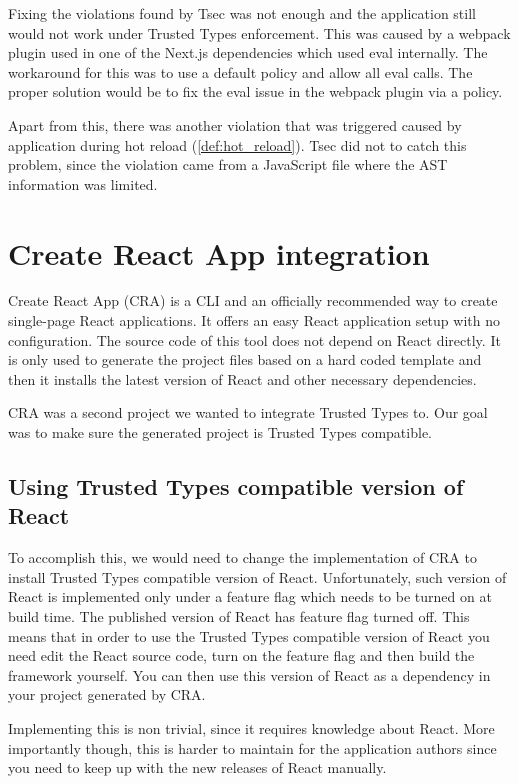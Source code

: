 Fixing the violations found by Tsec was not enough and the application still would not work under
Trusted Types enforcement. This was caused by a webpack plugin used in one of the Next.js
dependencies which used eval internally. The workaround for this was to use a default policy and
allow all eval calls. The proper solution would be to fix the eval issue in the webpack plugin via a
policy.

Apart from this, there was another violation that was triggered caused by application during hot
reload (\ref{def:hot_reload}). Tsec did not to catch this problem, since the violation came from a
JavaScript file where the AST information was limited.

\section{Create React App integration}

Create React App (CRA) is a CLI and an officially recommended way to create single-page React
applications. It offers an easy React application setup with no configuration. The source code of
this tool does not depend on React directly. It is only used to generate the project files based on
a hard coded template and then it installs the latest version of React and other necessary
dependencies.

CRA was a second project we wanted to integrate Trusted Types to. Our goal was to make sure the
generated project is Trusted Types compatible.

\subsection{Using Trusted Types compatible version of React}

To accomplish this, we would need to change the implementation of CRA to install Trusted Types
compatible version of React. Unfortunately, such version of React is implemented only under a
feature flag which needs to be turned on at build time. The published version of React has
feature flag turned off. This means that in order to use the Trusted Types compatible version of
React you need edit the React source code, turn on the feature flag and then build the framework
yourself. You can then use this version of React as a dependency in your project generated by CRA.

Implementing this is non trivial, since it requires knowledge about React. More importantly though,
this is harder to maintain for the application authors since you need to keep up with the new
releases of React manually.

